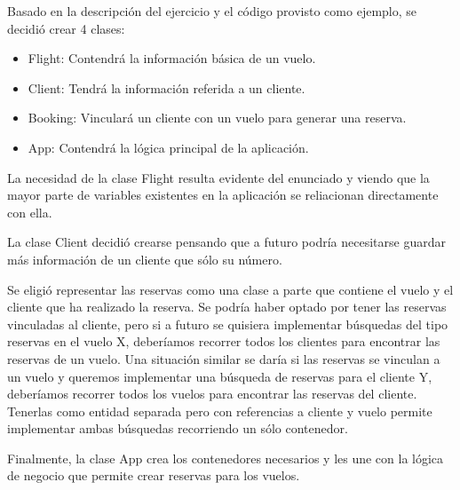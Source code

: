 \documentclass{article}
\begin{document}
Basado en la descripción del ejercicio y el código provisto como ejemplo, se
decidió crear 4 clases:
\begin{itemize}
    \item Flight: Contendrá la información básica de un vuelo.
    \item Client: Tendrá la información referida a un cliente.
    \item Booking: Vinculará un cliente con un vuelo para generar una reserva.
    \item App: Contendrá la lógica principal de la aplicación.
\end{itemize}

La necesidad de la clase Flight resulta evidente del enunciado y viendo que
la mayor parte de variables existentes en la aplicación se reliacionan
directamente con ella.

La clase Client decidió crearse pensando que a futuro podría necesitarse
guardar más información de un cliente que sólo su número.

Se eligió representar las reservas como una clase a parte que
contiene el vuelo y el cliente que ha realizado la reserva. Se podría haber
optado por tener las reservas vinculadas al cliente, pero si a
futuro se quisiera implementar búsquedas del tipo reservas en el vuelo X,
deberíamos recorrer todos los clientes para encontrar las reservas de un vuelo.
Una situación similar se daría si las reservas se vinculan a un vuelo y
queremos implementar una búsqueda de reservas para el cliente Y, deberíamos
recorrer todos los vuelos para encontrar las reservas del cliente. Tenerlas
como entidad separada pero con referencias a cliente y vuelo permite
implementar ambas búsquedas recorriendo un sólo contenedor.

Finalmente, la clase App crea los contenedores necesarios y les une con la
lógica de negocio que permite crear reservas para los vuelos.

\begin{figure}[H]
    \centering
    \scalebox{.5}{
        
    }
\end{figure}
\end{document}
